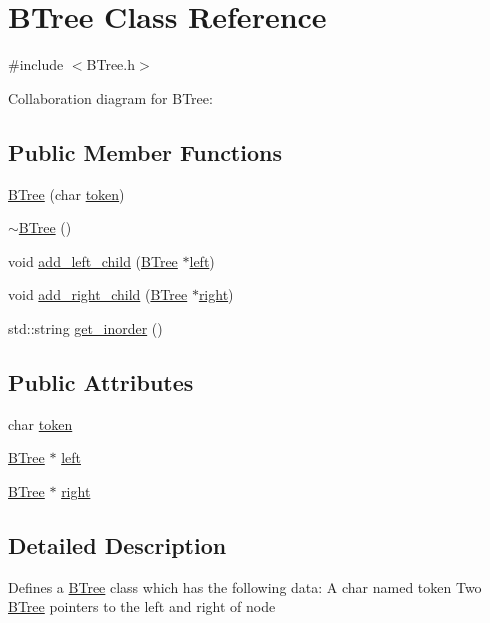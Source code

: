 \hypertarget{classBTree}{}\section{B\+Tree Class Reference}
\label{classBTree}


{\ttfamily \#include $<$B\+Tree.\+h$>$}



Collaboration diagram for B\+Tree\+:
\subsection*{Public Member Functions}
\begin{DoxyCompactItemize}
\item 
\hyperlink{classBTree_a816ccfed62d3bd439b61c03f660d1cc6}{B\+Tree} (char \hyperlink{classBTree_a3d5016b19ab621d5c61cf633ec012a72}{token})
\item 
\hyperlink{classBTree_a1d0dbad21ec825a7c8e5625709010e6c}{$\sim$\+B\+Tree} ()
\item 
void \hyperlink{classBTree_ae80b1f2b89c404206d76e5371c820d7a}{add\+\_\+left\+\_\+child} (\hyperlink{classBTree}{B\+Tree} $\ast$\hyperlink{classBTree_ad7e7d928a099c40fbd0d323f76d7cf18}{left})
\item 
void \hyperlink{classBTree_a03ed2114a3f21b5f1b6b0ae93d7cdc91}{add\+\_\+right\+\_\+child} (\hyperlink{classBTree}{B\+Tree} $\ast$\hyperlink{classBTree_af95770a535a9278b37fd73d7b6ae7f5e}{right})
\item 
std\+::string \hyperlink{classBTree_a408f4bcf02423637c7132bcc44646f01}{get\+\_\+inorder} ()
\end{DoxyCompactItemize}
\subsection*{Public Attributes}
\begin{DoxyCompactItemize}
\item 
char \hyperlink{classBTree_a3d5016b19ab621d5c61cf633ec012a72}{token}
\item 
\hyperlink{classBTree}{B\+Tree} $\ast$ \hyperlink{classBTree_ad7e7d928a099c40fbd0d323f76d7cf18}{left}
\item 
\hyperlink{classBTree}{B\+Tree} $\ast$ \hyperlink{classBTree_af95770a535a9278b37fd73d7b6ae7f5e}{right}
\end{DoxyCompactItemize}


\subsection{Detailed Description}
Defines a \hyperlink{classBTree}{B\+Tree} class which has the following data\+: A char named token Two \hyperlink{classBTree}{B\+Tree} pointers to the left and right of node 

